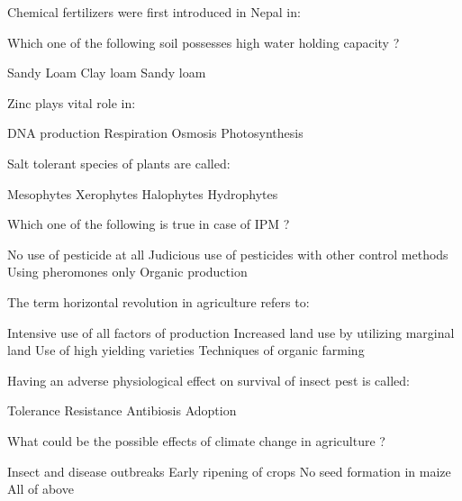 \begin{questions}
\question Chemical fertilizers were first introduced in Nepal in:
  \begin{choices}
  \end{choices}

\question Which one of the following soil possesses high water holding capacity ?
  \begin{choices}
  \choice Sandy
  \choice Loam
  \choice Clay loam
  \choice Sandy loam
  \end{choices}

\question Zinc plays vital role in:
  \begin{choices}
  \choice DNA production
  \choice Respiration
  \choice Osmosis
  \choice Photosynthesis
  \end{choices}

\question Salt tolerant species of plants are called:
  \begin{choices}
  \choice Mesophytes
  \choice Xerophytes
  \choice Halophytes
  \choice Hydrophytes
  \end{choices}

\question Which one of the following is true in case of IPM ?
  \begin{choices}
  \choice No use of pesticide at all
  \choice Judicious use of pesticides with other control methods
  \choice Using pheromones only
  \choice Organic production
  \end{choices}

\question The term horizontal revolution in agriculture refers to:
  \begin{choices}
  \choice Intensive use of all factors of production
  \choice Increased land use by utilizing marginal land
  \choice Use of high yielding varieties
  \choice Techniques of organic farming
  \end{choices}

\question Having an adverse physiological effect on survival of insect pest is called:
  \begin{choices}
  \choice Tolerance
  \choice Resistance
  \choice Antibiosis
  \choice Adoption
  \end{choices}

\question What could be the possible effects of climate change in agriculture ?
  \begin{choices}
  \choice Insect and disease outbreaks
  \choice Early ripening of crops
  \choice No seed formation in maize
  \choice All of above
  \end{choices}


\end{questions}
